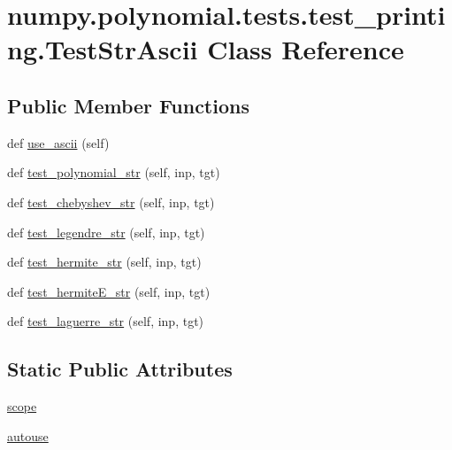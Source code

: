 \hypertarget{classnumpy_1_1polynomial_1_1tests_1_1test__printing_1_1TestStrAscii}{}\section{numpy.\+polynomial.\+tests.\+test\+\_\+printing.\+Test\+Str\+Ascii Class Reference}
\label{classnumpy_1_1polynomial_1_1tests_1_1test__printing_1_1TestStrAscii}
\subsection*{Public Member Functions}
\begin{DoxyCompactItemize}
\item 
def \hyperlink{classnumpy_1_1polynomial_1_1tests_1_1test__printing_1_1TestStrAscii_a89b10b42170ae42a6f719dbfb75573f4}{use\+\_\+ascii} (self)
\item 
def \hyperlink{classnumpy_1_1polynomial_1_1tests_1_1test__printing_1_1TestStrAscii_ad48d0a1ec30828cf0a565772ce5df62a}{test\+\_\+polynomial\+\_\+str} (self, inp, tgt)
\item 
def \hyperlink{classnumpy_1_1polynomial_1_1tests_1_1test__printing_1_1TestStrAscii_ab25c5503d593591109a3b19c67403aee}{test\+\_\+chebyshev\+\_\+str} (self, inp, tgt)
\item 
def \hyperlink{classnumpy_1_1polynomial_1_1tests_1_1test__printing_1_1TestStrAscii_aae591f6ed3f35101a5c7a968dc9bb2fe}{test\+\_\+legendre\+\_\+str} (self, inp, tgt)
\item 
def \hyperlink{classnumpy_1_1polynomial_1_1tests_1_1test__printing_1_1TestStrAscii_a14cc0189ccb135503ff40445597eed5c}{test\+\_\+hermite\+\_\+str} (self, inp, tgt)
\item 
def \hyperlink{classnumpy_1_1polynomial_1_1tests_1_1test__printing_1_1TestStrAscii_a5ac88e94751c231e764b6a0f6eb5d932}{test\+\_\+hermite\+E\+\_\+str} (self, inp, tgt)
\item 
def \hyperlink{classnumpy_1_1polynomial_1_1tests_1_1test__printing_1_1TestStrAscii_aec3772b702a4b1201525c48e05dd0f32}{test\+\_\+laguerre\+\_\+str} (self, inp, tgt)
\end{DoxyCompactItemize}
\subsection*{Static Public Attributes}
\begin{DoxyCompactItemize}
\item 
\hyperlink{classnumpy_1_1polynomial_1_1tests_1_1test__printing_1_1TestStrAscii_a0fa76b603324aedc750ce2d27ebb6bce}{scope}
\item 
\hyperlink{classnumpy_1_1polynomial_1_1tests_1_1test__printing_1_1TestStrAscii_aa1dd87ef1ddd7d050d38f74ebc1f2a9e}{autouse}
\end{DoxyCompactItemize}


